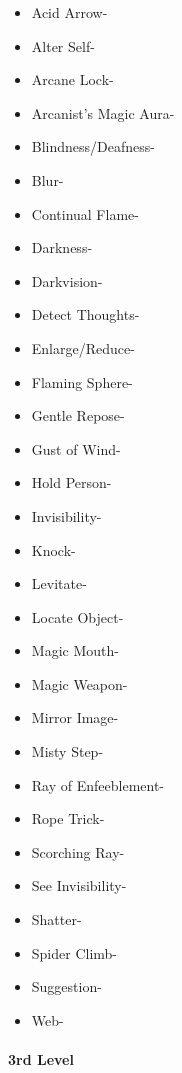\documentclass[
]{article}
\providecommand{\tightlist}{%
  \setlength{\itemsep}{0pt}\setlength{\parskip}{0pt}}
\begin{document}
\begin{itemize}
\tightlist
\item
  Acid Arrow-
\item
  Alter Self-
\item
  Arcane Lock-
\item
  Arcanist's Magic Aura-
\item
  Blindness/Deafness-
\item
  Blur-
\item
  Continual Flame-
\item
  Darkness-
\item
  Darkvision-
\item
  Detect Thoughts-
\item
  Enlarge/Reduce-
\item
  Flaming Sphere-
\item
  Gentle Repose-
\item
  Gust of Wind-
\item
  Hold Person-
\item
  Invisibility-
\item
  Knock-
\item
  Levitate-
\item
  Locate Object-
\item
  Magic Mouth-
\item
  Magic Weapon-
\item
  Mirror Image-
\item
  Misty Step-
\item
  Ray of Enfeeblement-
\item
  Rope Trick-
\item
  Scorching Ray-
\item
  See Invisibility-
\item
  Shatter-
\item
  Spider Climb-
\item
  Suggestion-
\item
  Web-
\end{itemize}

\hypertarget{3rd-level-7}{%
\paragraph{3rd Level}\label{3rd-level-7}}
\end{document}
